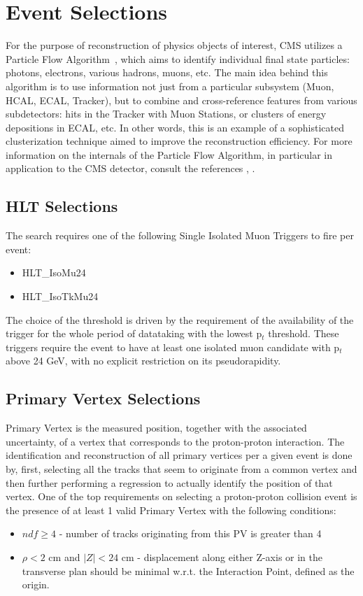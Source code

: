 \section{Event Selections} \label{section:higgs_selections}
For the purpose of reconstruction of physics objects of interest, CMS utilizes a Particle Flow Algorithm~\cite{CMS-PAS-PFT-10-002}, which aims to identify individual final state particles: photons, electrons, various hadrons, muons, etc. The main idea behind this algorithm is to use information not just from a particular subsystem (Muon, HCAL, ECAL, Tracker), but to combine and cross-reference features from various subdetectors: hits in the Tracker with Muon Stations, or clusters of energy depositions in ECAL, etc. In other words, this is an example of a sophisticated clusterization technique aimed to improve the reconstruction efficiency. For more information on the internals of the Particle Flow Algorithm, in particular in application to the CMS detector, consult the references \cite{Beaudette:2014cea}, \cite{Sirunyan:2017ulk}.

\subsection{HLT Selections}
The search requires one of the following Single Isolated Muon Triggers to fire per event:
\begin{itemize}
  \item HLT\_IsoMu24
  \item HLT\_IsoTkMu24
\end{itemize}
The choice of the threshold is driven by the requirement of the availability of the trigger for the whole period of datataking with the lowest p$_t$ threshold. These triggers require the event to have at least one isolated muon candidate with p$_t$ above 24 GeV, with no explicit restriction on its pseudorapidity.

\subsection{Primary Vertex Selections}
Primary Vertex is the measured position, together with the associated uncertainty, of a vertex that corresponds to the proton-proton interaction. The identification and reconstruction of all primary vertices per a given event is done by, first, selecting all the tracks that seem to originate from a common vertex and then further performing a regression to actually identify the position of that vertex. One of the top requirements on selecting a proton-proton collision event is the presence of at least 1 valid Primary Vertex with the following conditions:
\begin{itemize}
  \item $ndf \ge 4$ - number of tracks originating from this PV is greater than 4
  \item $\rho < 2$ cm and $|Z| < 24$ cm - displacement along either Z-axis or in the transverse plan should be minimal w.r.t. the Interaction Point, defined as the origin.
\end{itemize}

